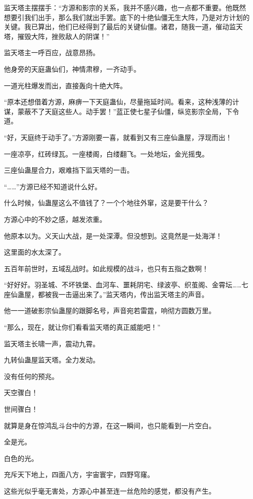 \begin{this_body}
监天塔主摆摆手：“方源和影宗的关系，我并不感兴趣，也一点都不重要。他既然想要引我们出手，那么我们就出手罢。底下的十绝仙僵无生大阵，乃是对方计划的关键。我已算出，他们已经得到了最后的关键仙僵。诸君，随我一道，催动监天塔，摧毁大阵，挫败敌人的阴谋！”

监天塔主一呼百应，战意昂扬。

他身旁的天庭蛊仙们，神情肃穆，一齐动手。

一道光柱爆发而出，直接轰向十绝大阵。

“原本还想借着方源，麻痹一下天庭蛊仙，尽量拖延时间。看来，这种浅薄的计谋，蒙蔽不了天庭这些人。动手罢！”蓝正使七星子仙僵，纵览影宗全局，下令道。

“好，天庭终于动手了。”方源刚要一喜，就看到又有三座仙蛊屋，浮现而出！

一座凉亭，红砖绿瓦。一座楼阁，白缕翻飞。一处地坛，金光摇曳。

三座仙蛊屋合力，艰难挡下监天塔的一击。

“……”方源已经不知道说什么好。

什么时候，仙蛊屋这么不值钱了？一个个地往外窜，这是要干什么？

方源心中的不妙之感，越发浓重。

他原本以为。义天山大战，是一处深潭。但没想到。这竟然是一处海洋！

这里面的水太深了。

五百年前世时，五域乱战时。如此规模的战斗，也只有五指之数啊！

“好好好。羽圣城、不坏铁堡、血河车、噩耗阴宅、绿波亭、织茧阁、金霄坛……七座仙蛊屋，都被我一击逼出来了。”监天塔内，传出监天塔主的声音。

他一一道破影宗仙蛊屋的跟脚名号，声音宛若雷霆，响彻方圆数万里。

“那么，现在，就让你们看看监天塔的真正威能吧！”

监天塔主长啸一声，震动九霄。

九转仙蛊屋监天塔。全力发动。

没有任何的预兆。

天空骤白！

世间骤白！

就算是身在惊鸿乱斗台中的方源，在这一瞬间，也只能看到一片空白。

全是光。

白色的光。

充斥天下地上，四面八方，宇宙寰宇，四野穹窿。

这些光似乎毫无害处，方源心中甚至连一丝危险的感觉，都没有产生。


\end{this_body}
